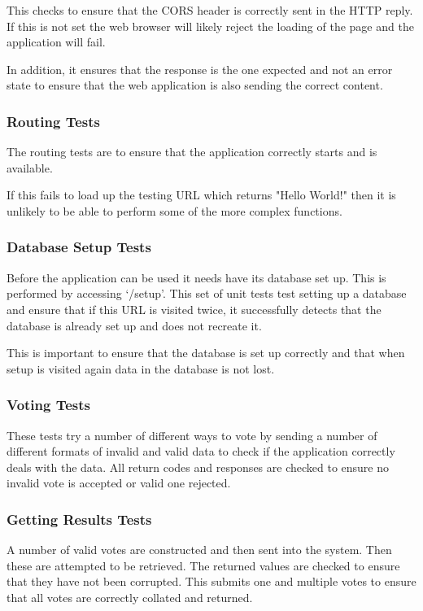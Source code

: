 This checks to ensure that the CORS header is correctly sent in the HTTP reply. If this is not set the web browser will likely reject the loading of the page and the application will fail.

In addition, it ensures that the response is the one expected and not an error state to ensure that the web application is also sending the correct content.

\subsubsection{Routing Tests}

The routing tests are to ensure that the application correctly starts and is available.

If this fails to load up the testing URL which returns "Hello World!" then it is unlikely to be able to perform some of the more complex functions.

\subsubsection{Database Setup Tests}

Before the application can be used it needs have its database set up. This is performed by accessing `/setup'. This set of unit tests test setting up a database and ensure that if this URL is visited twice, it successfully detects that the database is already set up and does not recreate it. 

This is important to ensure that the database is set up correctly and that when setup is visited again data in the database is not lost.

\subsubsection{Voting Tests}

These tests try a number of different ways to vote by sending a number of different formats of invalid and valid data to check if the application correctly deals with the data. All return codes and responses are checked to ensure no invalid vote is accepted or valid one rejected.

\subsubsection{Getting Results Tests}

A number of valid votes are constructed and then sent into the system. Then these are attempted to be retrieved. The returned values are checked to ensure that they have not been corrupted. This submits one and multiple votes to ensure that all votes are correctly collated and returned.

